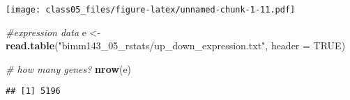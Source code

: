 \documentclass[]{article}
\newenvironment{Shaded}{\begin{snugshade}}{\end{snugshade}}
\newcommand{\KeywordTok}[1]{\textcolor[rgb]{0.13,0.29,0.53}{\textbf{#1}}}
\newcommand{\DataTypeTok}[1]{\textcolor[rgb]{0.13,0.29,0.53}{#1}}
\newcommand{\StringTok}[1]{\textcolor[rgb]{0.31,0.60,0.02}{#1}}
\newcommand{\CommentTok}[1]{\textcolor[rgb]{0.56,0.35,0.01}{\textit{#1}}}
\newcommand{\OtherTok}[1]{\textcolor[rgb]{0.56,0.35,0.01}{#1}}
\newcommand{\OperatorTok}[1]{\textcolor[rgb]{0.81,0.36,0.00}{\textbf{#1}}}
\newcommand{\NormalTok}[1]{#1}
\begin{document}
\begin{Shaded}
\end{Shaded}

\texttt{[image: class05\_files/figure-latex/unnamed-chunk-1-11.pdf]}

\begin{Shaded}
\begin{Highlighting}[]
\CommentTok{#expression data}
\NormalTok{e <-}\StringTok{ }\KeywordTok{read.table}\NormalTok{(}\StringTok{"bimm143_05_rstats/up_down_expression.txt"}\NormalTok{, }\DataTypeTok{header =} \OtherTok{TRUE}\NormalTok{)}

\CommentTok{# how many genes?}
\KeywordTok{nrow}\NormalTok{(e)}
\end{Highlighting}
\end{Shaded}

\begin{verbatim}
## [1] 5196
\end{verbatim}

\begin{Shaded}
\end{Shaded}
\end{document}
